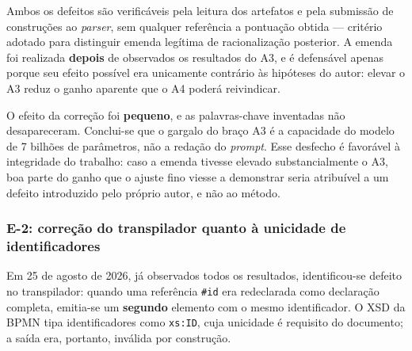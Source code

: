 Ambos os defeitos são verificáveis pela leitura dos artefatos e pela submissão de construções ao \textit{parser}, sem qualquer referência a pontuação obtida — critério adotado para distinguir emenda legítima de racionalização posterior. A emenda foi realizada \textbf{depois} de observados os resultados do A3, e é defensável apenas porque seu efeito possível era unicamente contrário às hipóteses do autor: elevar o A3 reduz o ganho aparente que o A4 poderá reivindicar.

\begin{table}[h!]
\end{table}

O efeito da correção foi \textbf{pequeno}, e as palavras-chave inventadas não desapareceram. Conclui-se que o gargalo do braço A3 é a capacidade do modelo de 7 bilhões de parâmetros, não a redação do \textit{prompt}. Esse desfecho é favorável à integridade do trabalho: caso a emenda tivesse elevado substancialmente o A3, boa parte do ganho que o ajuste fino viesse a demonstrar seria atribuível a um defeito introduzido pelo próprio autor, e não ao método.

\subsubsection*{E-2: correção do transpilador quanto à unicidade de identificadores}

Em 25 de agosto de 2026, já observados todos os resultados, identificou-se defeito no transpilador: quando uma referência \verb|#id| era redeclarada como declaração completa, emitia-se um \textbf{segundo} elemento com o mesmo identificador. O XSD da BPMN tipa identificadores como \verb|xs:ID|, cuja unicidade é requisito do documento; a saída era, portanto, inválida por construção.

